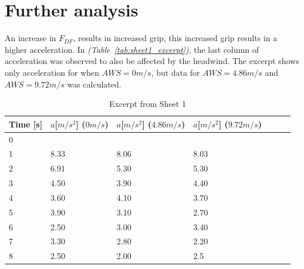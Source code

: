 \documentclass[11pt, a4paper]{article}
\begin{document}
\section{Further analysis}
An increase in $F_{DF}$, results in increased grip, this increased grip results in a higher acceleration. In \textit{(Table~\ref{tab:sheet1_excerpt})},
the last column of acceleration was observed to also be affected by the headwind. The excerpt shows only acceleration for when $AWS=0m/s$, but data for $AWS=4.86m/s$ and $AWS=9.72m/s$ was calculated.
\begin{table}[!ht]
    \centering
    \caption{Excerpt from Sheet 1}
    \begin{tabular}{|l|l|l|l|l|l|l|}
    \hline
        Time [s]  & $a$[$m/s^2$]  ($0m/s$)  & $a$[$m/s^2$] ($4.86m/s$)  & $a$[$m/s^2$] ($9.72m/s$)   \\ \hline
        0  &   &   &    \\ \hline
        1  & 8.33  & 8.06  & 8.03   \\ \hline
        2  & 6.91  & 5.30  & 5.30   \\ \hline
        3  & 4.50  & 3.90  & 4.40  \\ \hline
        4  & 3.60  & 4.10  & 3.70   \\ \hline
        5  & 3.90  & 3.10  & 2.70   \\ \hline
        6  & 2.50  & 3.00  & 3.40   \\ \hline
        7  & 3.30  & 2.80  & 2.20   \\ \hline
        8 & 2.50 & 2.00 & 2.5  \\ \hline
    \end{tabular}
~\label{tab:Accel}
\end{table}
\end{document}
